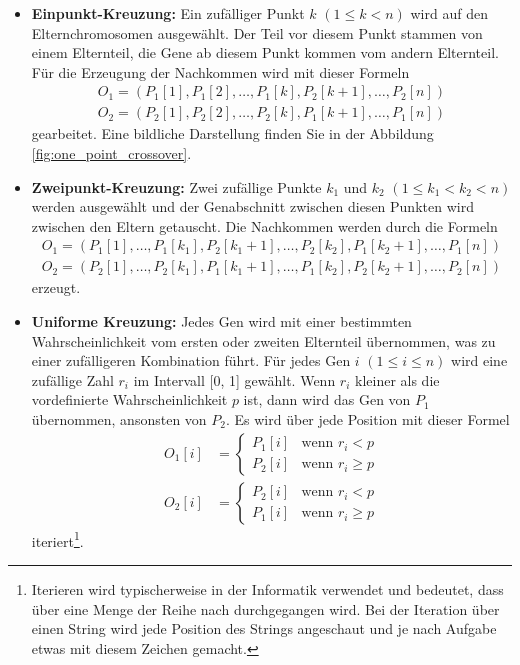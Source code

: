 \begin{itemize}
	\item \textbf{Einpunkt-Kreuzung:} Ein zufälliger Punkt \( k \) \((1 \leq k < n)\)
	wird auf den Elternchromosomen ausgewählt. Der Teil vor diesem Punkt stammen
	von einem Elternteil, die Gene ab diesem Punkt kommen vom andern Elternteil. 
	Für die Erzeugung der Nachkommen wird mit dieser Formeln
	\begin{align*}
		O_1 = (P_1[1], P_1[2], \ldots, P_1[k], P_2[k+1], \ldots, P_2[n])\\
		O_2 = (P_2[1], P_2[2], \ldots, P_2[k], P_1[k+1], \ldots, P_1[n])
	\end{align*}
	gearbeitet. Eine bildliche Darstellung finden Sie in der Abbildung 
	\ref{fig:one_point_crossover}.
	\item \textbf{Zweipunkt-Kreuzung:} Zwei zufällige Punkte \( k_1 \) und \( k_2 \)
	\((1 \leq k_1 < k_2 < n)\) werden ausgewählt und
	der Genabschnitt zwischen diesen Punkten wird zwischen den Eltern 
	getauscht. Die Nachkommen werden durch die Formeln
	\begin{align*}
		O_1 = (P_1[1], \ldots, P_1[k_1], P_2[k_1+1], \ldots, P_2[k_2], P_1[k_2+1], \ldots, P_1[n])\\
		O_2 = (P_2[1], \ldots, P_2[k_1], P_1[k_1+1], \ldots, P_1[k_2], P_2[k_2+1], \ldots, P_2[n])
	\end{align*}
	erzeugt.
	\item \textbf{Uniforme Kreuzung:} Jedes Gen wird mit einer bestimmten
	Wahrscheinlichkeit vom ersten oder zweiten Elternteil übernommen, was zu
	einer zufälligeren Kombination führt. Für jedes Gen \( i \) \((1 \leq i \leq n)\)
	wird eine zufällige Zahl \( r_i \) im Intervall [0, 1] gewählt. Wenn
	\( r_i \) kleiner als die vordefinierte Wahrscheinlichkeit \( p \) ist,
	dann wird das Gen von \( P_1 \) übernommen, ansonsten von \( P_2 \). Es
	wird über jede Position mit dieser Formel 
	\begin{align*}
		O_1[i] &=
		\begin{cases} 
			P_1[i] & \text{wenn } r_i < p       \\
			P_2[i] & \text{wenn } r_i \geq p 
		\end{cases}
		\\
		O_2[i] &=
		\begin{cases} 
			P_2[i] & \text{wenn } r_i < p       \\
			P_1[i] & \text{wenn } r_i \geq p 
		\end{cases}
	\end{align*}
	iteriert\footnote{
		Iterieren wird typischerweise in der Informatik verwendet und 
		bedeutet, dass über eine Menge der Reihe nach durchgegangen wird. 
		Bei der Iteration über einen String wird jede Position des Strings 
		angeschaut und je nach Aufgabe etwas mit diesem Zeichen gemacht.
		}.
\end{itemize}

